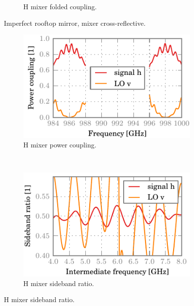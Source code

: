 \begin{figure}[hbtp]
\begin{subfigure}[b]{.5\textwidth}
        \caption{H mixer folded coupling.}
    \end{subfigure}%
    \caption{Imperfect rooftop mirror, mixer cross-reflective.}
    \label{fig:08_badrt_mhcr}
\end{figure}

\begin{figure}[hbtp]
    \centering
    \begin{subfigure}[b]{.5\textwidth}
        \includegraphics{chapter_3/09_badrt_mhcrco_h_dsb}%
        \caption{H mixer power coupling.}
    \end{subfigure}%
    \\
    \begin{subfigure}[b]{.5\textwidth}
        \includegraphics{chapter_3/09_badrt_mhcrco_h_sbr}%
        \caption{H mixer sideband ratio.}
    \end{subfigure}%

\end{figure}
